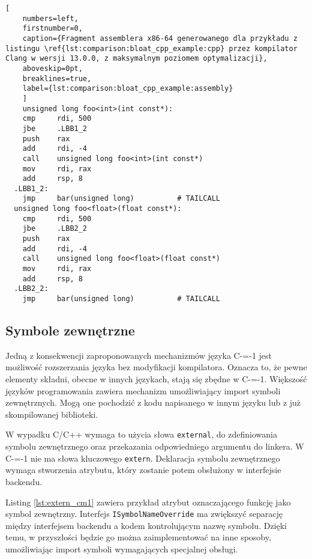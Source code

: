 \begin{minipage}{\textwidth}
  
  \begin{lstlisting}[
    numbers=left,
    firstnumber=0,
    caption={Fragment assemblera x86-64 generowanego dla przykładu z listingu \ref{lst:comparison:bloat_cpp_example:cpp} przez kompilator Clang w wersji 13.0.0, z maksymalnym poziomem optymalizacji},
    aboveskip=0pt,
    breaklines=true,
    label={lst:comparison:bloat_cpp_example:assembly}
    ]
    unsigned long foo<int>(int const*):
    cmp     rdi, 500
    jbe     .LBB1_2
    push    rax
    add     rdi, -4
    call    unsigned long foo<int>(int const*)
    mov     rdi, rax
    add     rsp, 8
  .LBB1_2:
    jmp     bar(unsigned long)          # TAILCALL
  unsigned long foo<float>(float const*):
    cmp     rdi, 500
    jbe     .LBB2_2
    push    rax
    add     rdi, -4
    call    unsigned long foo<float>(float const*)
    mov     rdi, rax
    add     rsp, 8
  .LBB2_2:
    jmp     bar(unsigned long)          # TAILCALL
  \end{lstlisting}
  
  
\end{minipage}
\subsection{Symbole zewnętrzne}
\label{Language_extensibility}
\label{external_symbols}
Jedną z konsekwencji zaproponowanych mechanizmów języka C-=-1 jest możliwość rozszerzania języka bez modyfikacji kompilatora.
Oznacza to, że pewne elementy składni, obecne w innych językach, stają się zbędne w C-=-1.
Większość języków programowania zawiera mechanizm umożliwiający import symboli zewnętrznych.
Mogą one pochodzić z kodu napisanego w innym języku lub z już skompilowanej biblioteki.

W wypadku C/C++ wymaga to użycia słowa \lstinline{external}, do zdefiniowania symbolu zewnętrznego oraz przekazania odpowiedniego argumentu do linkera.
W C-=-1 nie ma słowa kluczowego \lstinline{extern}.
Deklaracja symbolu zewnętrznego wymaga stworzenia atrybutu, który zostanie potem obsłużony w interfejsie backendu.

Listing \ref{lst:extern_cm1} zawiera przykład atrybut oznaczającego funkcję jako symbol zewnętrzny.
Interfejs \lstinline{ISymbolNameOverride} ma zwiększyć separację między interfejsem backendu a kodem kontrolującym nazwę symbolu.
Dzięki temu, w przyszłości będzie go można zaimplementować na inne sposoby, umożliwiając import symboli wymagających specjalnej obsługi.

